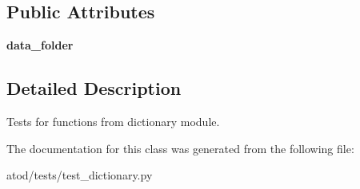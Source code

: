 \subsection*{Public Attributes}
\begin{DoxyCompactItemize}
\item 
{\bfseries data\+\_\+folder}\hypertarget{classatod_1_1tests_1_1test__dictionary_1_1_test_dictionary_a6298cd582fba81f5c367ca216a71221b}{}\label{classatod_1_1tests_1_1test__dictionary_1_1_test_dictionary_a6298cd582fba81f5c367ca216a71221b}

\end{DoxyCompactItemize}


\subsection{Detailed Description}
\begin{DoxyVerb}Tests for functions from dictionary module. \end{DoxyVerb}
 

The documentation for this class was generated from the following file\+:\begin{DoxyCompactItemize}
\item 
atod/tests/test\+\_\+dictionary.\+py\end{DoxyCompactItemize}
